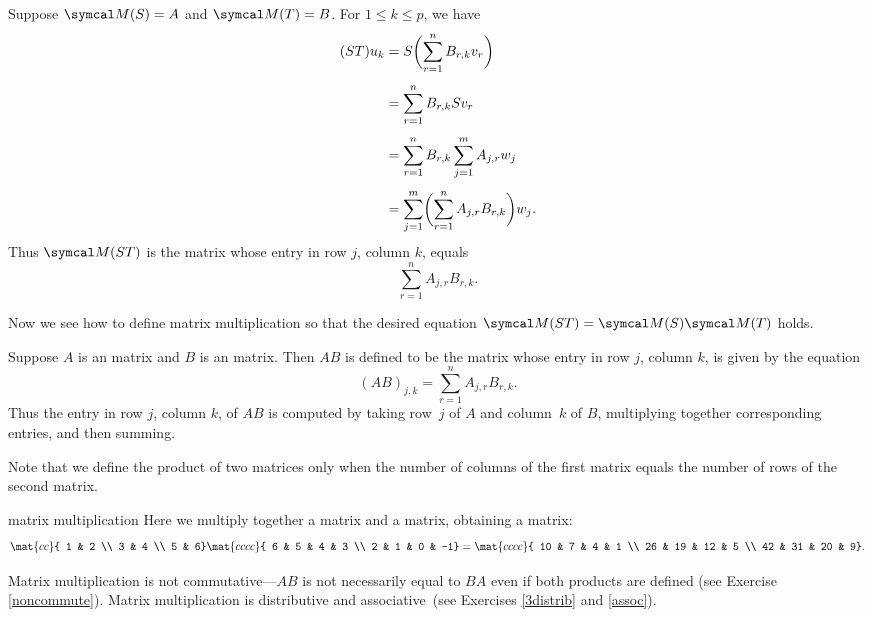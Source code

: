 Suppose $\M(S) = A$ and $\M(T) = B$.
For $1 \le k \le p$, we have
\begin{align*}
(ST)u_k &= S\paren[\bigg]{ \sum_{r=1}^n B_{r,k} v_r } \\[4bp]
&= \sum_{r=1}^n B_{r,k} Sv_r \\[4bp]
&= \sum_{r=1}^n B_{r,k} \sum_{j=1}^m A_{j,r} w_j \\[4bp]
&= \sum_{j=1}^m \paren[\bigg]{\sum_{r=1}^n A_{j,r} B_{r,k}}  w_j.
\end{align*}
Thus $\M(ST)$ is the  matrix whose entry in row $j$, column $k$,
equals
\[
\sum_{r=1}^n A_{j,r} B_{r,k}.
\]

Now we see how to define matrix multiplication so that the desired equation $\M(ST) = \M(S) \M(T)$ holds.

{Suppose $A$ is an  matrix and $B$ is an
 matrix. Then $AB$ is defined to be the
 matrix whose entry in row $j$, column $k$, is given by the equation
\[
(AB)_{j,k} = \sum_{r=1}^n A_{j,r} B_{r,k}.
\]
Thus the entry in row  $j$, column $k$, of $AB$ is computed by taking
row~$j$ of $A$ and column~$k$ of $B$, multiplying together corresponding
entries, and then summing.}


Note that we define the product of two matrices only when the number of
columns of the first matrix equals the number of rows of the second matrix.

\medskip

\begin{example}[matprod]{matrix multiplication}
Here we multiply together a  matrix and a  matrix, obtaining a  matrix:
\[
\mat{cc}{
1 & 2 \\
3 & 4 \\
5 & 6}
\mat{cccc}{
6 & 5 & 4 & 3 \\
2 & 1 & 0 & -1} =
\mat{cccc}{
10 & 7 & 4 & 1 \\
26 & 19 & 12 & 5 \\
42 & 31 & 20 & 9}.
\]
\vspace{-.13in}
\end{example}

Matrix multiplication is not commutative---$AB$ is not necessarily equal to $BA$ even if both products are defined (see Exercise \ref{noncommute}). Matrix multiplication is distributive and associative\ (see Exercises \ref{3distrib} and \ref{assoc}).

